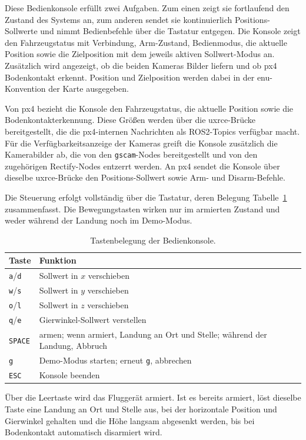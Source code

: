 Diese Bedienkonsole erfüllt zwei Aufgaben.
Zum einen zeigt sie fortlaufend den Zustand des Systems an, zum anderen sendet sie kontinuierlich Positions-Sollwerte und nimmt Bedienbefehle über die Tastatur entgegen.
Die Konsole zeigt den Fahrzeugstatus mit Verbindung, Arm-Zustand, Bedienmodus, die aktuelle Position sowie die Zielposition mit dem jeweils aktiven Sollwert-Modus an.
Zusätzlich wird angezeigt, ob die beiden Kameras Bilder liefern und ob \gls{px4} Bodenkontakt erkennt.
Position und Zielposition werden dabei in der \gls{enu}-Konvention der Karte ausgegeben.

Von \gls{px4} bezieht die Konsole den Fahrzeugstatus, die aktuelle Position sowie die Bodenkontakterkennung.
Diese Größen werden über die \gls{uxrce}-Brücke bereitgestellt, die die \gls{px4}-internen Nachrichten als ROS2-Topics verfügbar macht.
Für die Verfügbarkeitsanzeige der Kameras greift die Konsole zusätzlich die Kamerabilder ab, die von den \texttt{gscam}-Nodes bereitgestellt und von den zugehörigen Rectify-Nodes entzerrt werden.
An \gls{px4} sendet die Konsole über dieselbe \gls{uxrce}-Brücke den Positions-Sollwert sowie Arm- und Disarm-Befehle.

Die Steuerung erfolgt vollständig über die Tastatur, deren Belegung Tabelle~\ref{tab:konsole_tasten} zusammenfasst.
Die Bewegungstasten wirken nur im armierten Zustand und weder während der Landung noch im Demo-Modus.
\begin{table}[htbp]
\centering
\caption{Tastenbelegung der Bedienkonsole.}
\label{tab:konsole_tasten}
\begin{tabular}{ll}
\toprule
Taste & Funktion \\
\midrule
\texttt{a}/\texttt{d} & Sollwert in $x$ verschieben \\
\texttt{w}/\texttt{s} & Sollwert in $y$ verschieben \\
\texttt{o}/\texttt{l} & Sollwert in $z$ verschieben \\
\texttt{q}/\texttt{e} & Gierwinkel-Sollwert verstellen \\
\texttt{SPACE} & armen; wenn armiert, Landung an Ort und Stelle; während der Landung, Abbruch \\
\texttt{g} & Demo-Modus starten; erneut \texttt{g}, abbrechen \\
\texttt{ESC} & Konsole beenden \\
\bottomrule
\end{tabular}
\end{table}

Über die Leertaste wird das Fluggerät armiert.
Ist es bereits armiert, löst dieselbe Taste eine Landung an Ort und Stelle aus, 
bei der horizontale Position und Gierwinkel gehalten und die Höhe langsam abgesenkt werden, bis bei Bodenkontakt automatisch disarmiert wird.

